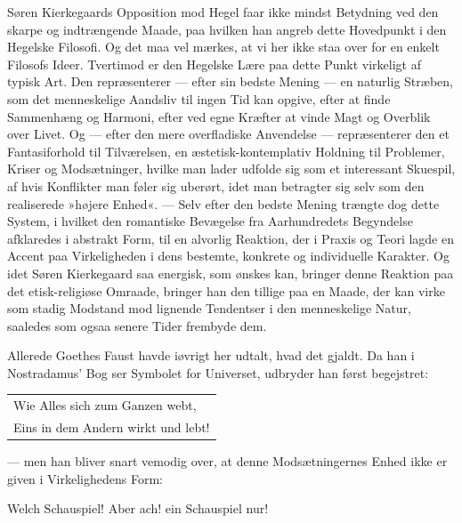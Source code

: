 \documentclass[12pt,a4paper,openany]{book}
\newcommand{\opage}[1]{\marginnote{\footnotesize\textit{[#1]}}}
\begin{document}
Søren Kierkegaards Opposition mod Hegel faar ikke
mindst Betydning ved den skarpe og indtrængende Maade,
paa hvilken han angreb dette Hovedpunkt i den Hegelske
Filosofi. Og det maa vel mærkes, at vi her ikke staa
over for en enkelt Filosofs Ideer. Tvertimod er den
Hegelske Lære paa dette Punkt virkeligt af typisk Art.
Den repræsenterer --- efter sin bedste Mening --- en
naturlig Stræben, som det menneskelige Aandsliv til
ingen Tid kan opgive, efter at finde Sammenhæng og
Harmoni, efter ved egne Kræfter at vinde Magt og Overblik
over Livet. Og --- efter den mere overfladiske Anvendelse
--- repræsenterer den et Fantasiforhold til Tilværelsen,
en æstetisk-kontemplativ Holdning til Problemer,
Kriser og Modsætninger, hvilke man lader udfolde sig
som et interessant Skuespil, af hvis Konflikter man føler
sig uberørt, idet man betragter sig selv som den realiserede
»højere Enhed«. --- Selv efter den bedste Mening
trængte dog dette System, i hvilket den romantiske Bevægelse
fra Aarhundredets Begyndelse afklaredes i
abstrakt Form, til en alvorlig Reaktion, der i Praxis og
Teori lagde en Accent paa Virkeligheden i dens bestemte,
konkrete og individuelle Karakter. Og idet Søren Kierkegaard
saa energisk, som ønskes kan, bringer denne
Reaktion paa det etisk-religiøse Omraade, bringer han
den tillige paa en Maade, der kan virke som stadig Modstand
mod lignende Tendentser i den menneskelige Natur,
saaledes som ogsaa senere Tider frembyde dem.

Allerede Goethes Faust havde iøvrigt her udtalt,
hvad det gjaldt. Da han i Nostradamus' Bog ser Symbolet
for Universet, udbryder han først begejstret:

\opage{15}\begin{center}\small\begin{tabular}{@{}l@{}}
Wie Alles sich zum Ganzen webt,\\
Eins in dem Andern wirkt und lebt!
\end{tabular}\end{center}
--- men han bliver snart vemodig over, at denne Modsætningernes
Enhed ikke er given i Virkelighedens Form:
\begin{center}\small Welch Schauspiel! Aber ach! ein Schauspiel nur!\end{center}
\end{document}

